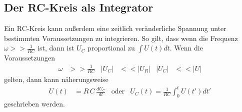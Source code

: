 \subsection{Der RC-Kreis als Integrator} %
\label{sub:Integrator4}
Ein RC-Kreis kann außerdem eine zeitlich veränderliche Spannung unter bestimmten Voraussetzungen zu integrieren.
So gilt, dass wenn die Frequenz $\omega >> \frac{1}{RC}$ ist, dann ist $U_C$ proportional zu $\int U(t)dt$.
Wenn die Voraussetzungen
\begin{align*}
    \omega&>>\frac{1}{RC}&\lvert U_C\rvert&<< \lvert U_R\rvert & \lvert U_C\rvert &<< \lvert U\rvert
\end{align*}
gelten, dann kann näherungsweise
\begin{align}
    U(t) &= R\,C \,\frac{dU_C}{dt} &\text{oder} & U_C(t) = \frac{1}{RC} \int^t_0 U(t') dt'
\end{align}
geschrieben werden.

